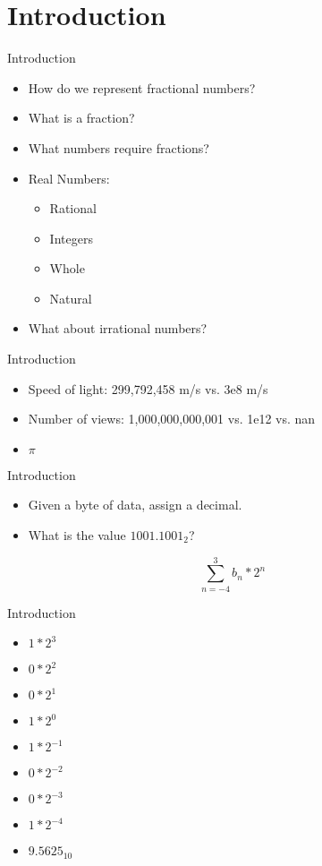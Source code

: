 \section{Introduction}
\begin{frame}{Introduction}
  \begin{itemize}
  \item How do we represent fractional numbers?
  \item What is a fraction?
  \item What numbers require fractions?
  \item Real Numbers:
    \begin{itemize}
    \item Rational
    \item Integers
    \item Whole
    \item Natural
    \end{itemize}
  \item What about irrational numbers?
  \end{itemize}
\end{frame}
\begin{frame}{Introduction}
  \begin{itemize}
  \item Speed of light: 299,792,458 m/s vs. 3e8 m/s
  \item Number of views: 1,000,000,000,001 vs. 1e12 vs. nan
  \item $\pi$
  \end{itemize}
\end{frame}
\begin{frame}{Introduction}
  \begin{itemize}
  \item Given a byte of data, assign a decimal.
  \item What is the value $1001.1001_{2}$?
  \end{itemize}
  \begin{equation}
    \sum_{n=-4}^{3} b_{n}*2^{n}
  \end{equation}
\end{frame}
\begin{frame}{Introduction}
  \begin{itemize}
  \item $1 * 2^{3}$
  \item $0 * 2^{2}$
  \item $0 * 2^{1}$
  \item $1 * 2^{0}$
  \item $1 * 2^{-1}$
  \item $0 * 2^{-2}$
  \item $0 * 2^{-3}$
  \item $1 * 2^{-4}$
    \item $9.5625_{10}$
  \end{itemize}
\end{frame}
